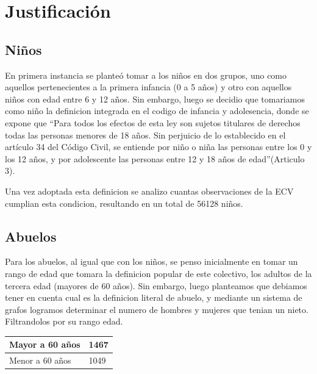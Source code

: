 \documentclass[
]{article}
\begin{document}
\hypertarget{justificaciuxf3n}{%
\section{Justificación}\label{justificaciuxf3n}}

\hypertarget{niuxf1os}{%
\subsection{Niños}\label{niuxf1os}}

En primera instancia se planteó tomar a los niños en dos grupos, uno
como aquellos pertenecientes a la primera infancia (0 a 5 años) y otro
con aquellos niños con edad entre 6 y 12 años. Sin embargo, luego se
decidio que tomariamos como niño la definicion integrada en el codigo de
infancia y adolesencia, donde se expone que ``Para todos los efectos de
esta ley son sujetos titulares de derechos todas las personas menores de
18 años. Sin perjuicio de lo establecido en el artículo 34 del Código
Civil, se entiende por niño o niña las personas entre los 0 y los 12
años, y por adolescente las personas entre 12 y 18 años de
edad''(Articulo 3).

Una vez adoptada esta definicion se analizo cuantas observaciones de la
ECV cumplian esta condicion, resultando en un total de 56128 niños.

\hypertarget{abuelos}{%
\subsection{Abuelos}\label{abuelos}}

Para los abuelos, al igual que con los niños, se penso inicialmente en
tomar un rango de edad que tomara la definicion popular de este
colectivo, los adultos de la tercera edad (mayores de 60 años). Sin
embargo, luego planteamos que debiamos tener en cuenta cual es la
definicion literal de abuelo, y mediante un sistema de grafos logramos
determinar el numero de hombres y mujeres que tenian un nieto.
Filtrandolos por su rango edad.

\begin{table}[H]
\begin{center}
\begin{tabular}{|l|l|}
\hline
Mayor a 60 años & 1467 \\ \hline
Menor a 60 años & 1049 \\ \hline
\end{tabular}
\end{center}
\end{table}
\end{document}
